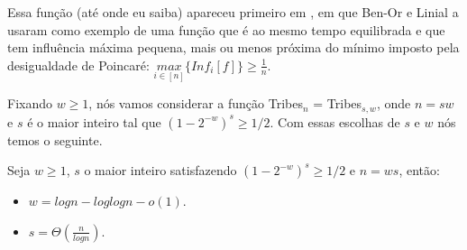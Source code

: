 Essa função (até onde eu saiba) apareceu primeiro em \cite{ben1990collective}, em que Ben-Or e Linial a usaram como exemplo de uma função que é ao mesmo tempo equilibrada e que tem influência máxima pequena, mais ou menos próxima do mínimo imposto pela desigualdade de Poincaré: $\underset{i \in [n]}{max}\{Inf_{i}[f]\} \geq \frac{1}{n}$.

Fixando $w \geq 1$, nós vamos considerar a função Tribes$_{n}$ = Tribes$_{s, w}$, onde $n = sw$ e $s$ é o maior inteiro tal que $(1 - 2^{-w})^{s} \geq 1/2$. Com essas escolhas de $s$ e $w$ nós temos o seguinte.

\begin{prop} \label{prop: tribes_n}

    Seja $w \geq 1$, $s$ o maior inteiro satisfazendo $(1 - 2^{-w})^{s} \geq 1/2$ e $n = ws$, então: 

    \begin{itemize}

        \item $w = logn - loglogn - o(1)$.

        \item $s = \Theta(\frac{n}{logn})$.

    \end{itemize}

\end{prop}

